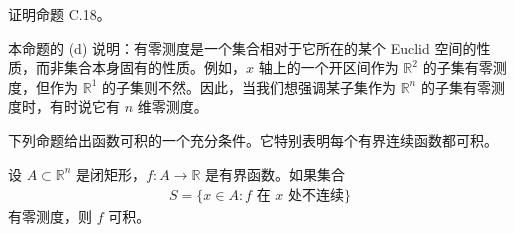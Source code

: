 \documentclass[../../main.tex]{subfiles}
\begin{document}
\begin{exercise}\label{exercise:appC-C-19}
证明命题 C.18。
\end{exercise}

本命题的 (d) 说明：有零测度是一个集合相对于它所在的某个 Euclid 空间的性质，而非集合本身固有的性质。例如，$x$ 轴上的一个开区间作为 $\mathbb R^2$ 的子集有零测度，但作为 $\mathbb R^1$ 的子集则不然。因此，当我们想强调某子集作为 $\mathbb R^n$ 的子集有零测度时，有时说它有 $n$ 维零测度。

下列命题给出函数可积的一个充分条件。它特别表明每个有界连续函数都可积。

\begin{proposition}\label{proposition:appC-lebesgue-integrability}
设 $A\subset\mathbb R^n$ 是闭矩形，$f:A\to\mathbb R$ 是有界函数。如果集合
\begin{align*}
S=\{x\in A:f\text{ 在 }x\text{ 处不连续}\}
\end{align*}
有零测度，则 $f$ 可积。
\end{proposition}
\end{document}
